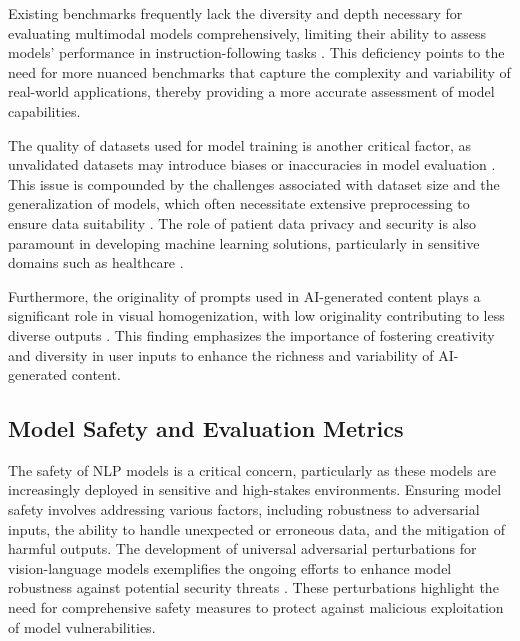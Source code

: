 Existing benchmarks frequently lack the diversity and depth necessary for evaluating multimodal models comprehensively, limiting their ability to assess models' performance in instruction-following tasks \cite{liu2024visual}. This deficiency points to the need for more nuanced benchmarks that capture the complexity and variability of real-world applications, thereby providing a more accurate assessment of model capabilities.



The quality of datasets used for model training is another critical factor, as unvalidated datasets may introduce biases or inaccuracies in model evaluation \cite{reddy2024docfinqalongcontextfinancialreasoning}. This issue is compounded by the challenges associated with dataset size and the generalization of models, which often necessitate extensive preprocessing to ensure data suitability \cite{zolfaghari2023surveyautomateddetectionclassification}. The role of patient data privacy and security is also paramount in developing machine learning solutions, particularly in sensitive domains such as healthcare \cite{shanks2004speculationgraphcomputationarchitectures}.



Furthermore, the originality of prompts used in AI-generated content plays a significant role in visual homogenization, with low originality contributing to less diverse outputs \cite{palmini2024patternscreativityuserinput}. This finding emphasizes the importance of fostering creativity and diversity in user inputs to enhance the richness and variability of AI-generated content.






\subsection{Model Safety and Evaluation Metrics} \label{subsec:Model Safety and Evaluation Metrics}



The safety of NLP models is a critical concern, particularly as these models are increasingly deployed in sensitive and high-stakes environments. Ensuring model safety involves addressing various factors, including robustness to adversarial inputs, the ability to handle unexpected or erroneous data, and the mitigation of harmful outputs. The development of universal adversarial perturbations for vision-language models exemplifies the ongoing efforts to enhance model robustness against potential security threats \cite{zhang2024universaladversarialperturbationsvisionlanguage}. These perturbations highlight the need for comprehensive safety measures to protect against malicious exploitation of model vulnerabilities.


